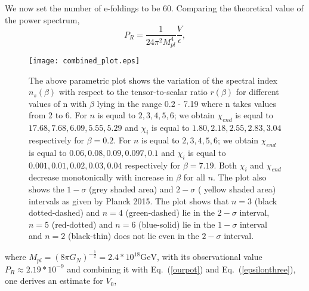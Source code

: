 \documentclass[prd,twocolumn,superscriptaddress]{revtex4}
\begin{document}
We now set the number of e-foldings to be $60$. Comparing the theoretical value of the power spectrum,
\begin{equation}
P_{R} = \frac{1}{24 \pi^2 M_{pl}^4} \frac{V}{\epsilon},
\end{equation}
  \begin{figure}[h]
 \centering
 \texttt{[image: combined\_plot.eps]}
%  
 \caption{The above parametric plot shows the variation of the spectral index $n_s (\beta)$ with respect to the  tensor-to-scalar ratio
 $r (\beta)$ for different values of n with $\beta$ lying in the range 0.2 - 7.19  where n takes values from 2 to 6.
 For $n$ is equal to $2,3,4,5,6$; we obtain $\chi_{end}$ is equal to $17.68,7.68,6.09,5.55,5.29$ and $\chi_{i}$ is equal to
 $1.80,2.18,2.55,2.83,3.04$ respectively for $\beta=0.2$. For $n$ is equal to $2,3,4,5,6$; we obtain $\chi_{end}$ is equal to $0.06,0.08,0.09,0.097,0.1$ and $\chi_{i}$ is equal to
 $0.001,0.01,0.02,0.03,0.04$ respectively for $\beta=7.19$. Both $\chi_{i}$ and $\chi_{end}$ decrease monotonically with increase 
 in $\beta$ for all $n$.
 The plot also shows
 the $1-\sigma$ (grey shaded area) and $2-\sigma$ ( yellow shaded area) intervals as given by Planck 2015. The plot shows that
 $n = 3$ (black dotted-dashed) and $n = 4$ (green-dashed) lie in the $2 - \sigma$ interval, $n = 5$ (red-dotted) and $n = 6$ (blue-solid) lie in the
 $1 - \sigma$ interval and $n = 2$ (black-thin) does not lie even in the $2 -\sigma$ interval.}
 \label{allplots}
 \end{figure}
where $M_{pl} = {\left( 8 \pi G_{N} \right)}^{- \frac{1}{2}} = 2.4 * 10^{18} \mbox{GeV}$, with its observational value
$P_R \approx 2.19 * 10^{-9}$ and combining it with Eq.~(\ref{ourpot}) and Eq.~(\ref{epsilonthree}), one derives an estimate for  $V_0$, 
\end{document}
